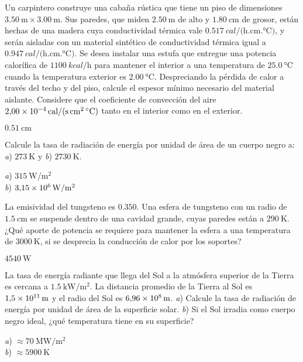 %
\begin{Exercise}
  Un carpintero construye una cabaña rústica que tiene un piso de dimensiones $\SI{3.50}{\metre} \times \SI{3.00}{\metre}$. Sus paredes, que miden $\SI{2.50}{\metre}$ de alto y $\SI{1.80}{\centi\metre}$ de grosor, están hechas de una madera cuya conductividad térmica vale $\SI{0.517}{cal/(\hour.\centi\metre.\celsius)}$, y serán aisladas con un material sintético de conductividad térmica igual a $\SI{0.947}{cal/(\hour.\centi\metre.\celsius)}$. Se desea instalar una estufa que entregue una potencia calorífica de $\SI{1100}{kcal/\hour}$ para mantener el interior a una temperatura de $\SI{25.0}{\celsius}$ cuando la temperatura exterior es $\SI{2.00}{\celsius}$. Despreciando la pérdida de calor a través del techo y del piso, calcule el espesor mínimo necesario del material aislante. Considere que el  coeficiente de convección del aire $\SI{2.00E-4}{cal/(\second.\centi\square\metre.\celsius)}$ tanto en el interior como en el exterior.
\end{Exercise}
\begin{Answer}
  $\SI{0.51}{\centi\metre}$
\end{Answer}
%
\begin{Exercise}
  Calcule la tasa de radiación de energía por unidad de área de un cuerpo negro a: \textit{a}) $\SI{273}{\kelvin}$ y \textit{b}) $\SI{2730}{\kelvin}$.
\end{Exercise}
\begin{Answer}
	\begin{minipage}[t]{.4\textwidth}
    \textit{a}) $\SI{315}{\watt/\square\metre}$\\ \textit{b}) $\SI{3.15E6}{\watt/\square\metre}$
  \end{minipage}
\end{Answer}
%
\begin{Exercise}
  {}{}
  La emisividad del tungsteno es $0.350$. Una esfera de tungsteno con un radio de $\SI{1.5}{\centi\metre}$ se suspende dentro de una cavidad grande, cuyas paredes están a $\SI{290}{\kelvin}$. ¿Qué aporte de potencia se requiere para mantener la esfera a una temperatura de $\SI{3000}{\kelvin}$, si se desprecia la conducción de calor por los soportes?
\end{Exercise}
\begin{Answer}
  $\SI{4540}{\watt}$
\end{Answer}
%
\begin{Exercise}
  La tasa de energía radiante que llega del Sol a la atmósfera superior de la Tierra es cercana a $\SI{1.5}{\kilo\watt/\square\metre}$. La distancia promedio de la Tierra al Sol es $\SI{1.5E11}{\metre}$ y el radio del Sol es $\SI{6.96E8}{\metre}$. \textit{a}) Calcule la tasa de radiación de energía por unidad de área de la superficie solar. \textit{b}) Si el Sol irradia como cuerpo negro ideal, ¿qué temperatura tiene en su superficie?
\end{Exercise}
\begin{Answer}
	\begin{minipage}[t]{.4\textwidth}
    \textit{a}) $\approx\SI{70}{\mega\watt/\square\metre}$\\ \textit{b}) $\approx\SI{5900}{\kelvin}$
  \end{minipage}
\end{Answer}
%